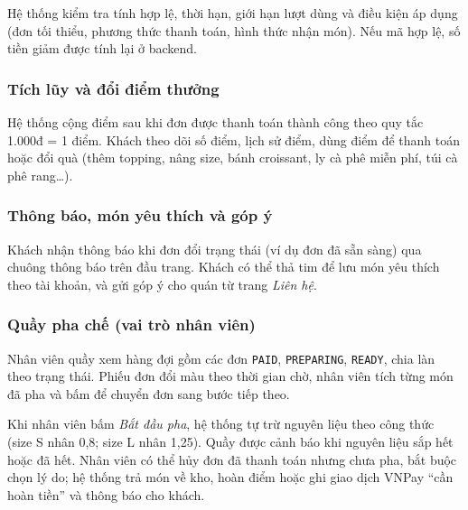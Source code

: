 \documentclass[12pt,a4paper]{article}
\begin{document}
Hệ thống kiểm tra tính hợp lệ, thời hạn, giới hạn lượt dùng và điều kiện áp dụng (đơn tối thiểu, phương thức thanh toán, hình thức nhận món). Nếu mã hợp lệ, số tiền giảm được tính lại ở backend.

\subsubsection{Tích lũy và đổi điểm thưởng}
Hệ thống cộng điểm sau khi đơn được thanh toán thành công theo quy tắc 1.000đ = 1 điểm. Khách theo dõi số điểm, lịch sử điểm, dùng điểm để thanh toán hoặc đổi quà (thêm topping, nâng size, bánh croissant, ly cà phê miễn phí, túi cà phê rang\ldots).

\subsubsection{Thông báo, món yêu thích và góp ý}
Khách nhận thông báo khi đơn đổi trạng thái (ví dụ đơn đã sẵn sàng) qua chuông thông báo trên đầu trang. Khách có thể thả tim để lưu món yêu thích theo tài khoản, và gửi góp ý cho quán từ trang \textit{Liên hệ}.

\subsubsection{Quầy pha chế (vai trò nhân viên)}
Nhân viên quầy xem hàng đợi gồm các đơn \texttt{PAID}, \texttt{PREPARING}, \texttt{READY}, chia làn theo trạng thái. Phiếu đơn đổi màu theo thời gian chờ, nhân viên tích từng món đã pha và bấm để chuyển đơn sang bước tiếp theo.

Khi nhân viên bấm \textit{Bắt đầu pha}, hệ thống tự trừ nguyên liệu theo công thức (size S nhân 0,8; size L nhân 1,25). Quầy được cảnh báo khi nguyên liệu sắp hết hoặc đã hết. Nhân viên có thể hủy đơn đã thanh toán nhưng chưa pha, bắt buộc chọn lý do; hệ thống trả món về kho, hoàn điểm hoặc ghi giao dịch VNPay ``cần hoàn tiền'' và thông báo cho khách.
\end{document}

